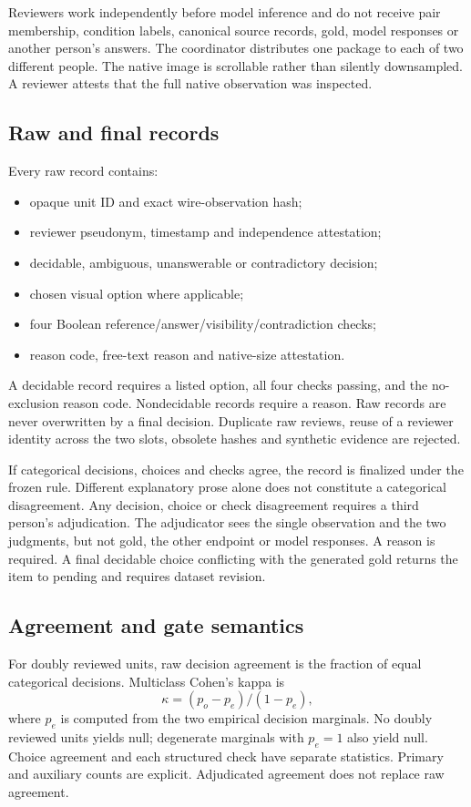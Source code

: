 \documentclass[10pt,twocolumn,letterpaper]{article}
\begin{document}
Reviewers work independently before model inference and do not receive
pair membership, condition labels, canonical source records, gold,
model responses or another person's answers. The coordinator distributes
one package to each of two different people. The native image is
scrollable rather than silently downsampled. A reviewer attests that
the full native observation was inspected.

\subsection{Raw and final records}
Every raw record contains:
\begin{itemize}\setlength\itemsep{1pt}
\item opaque unit ID and exact wire-observation hash;
\item reviewer pseudonym, timestamp and independence attestation;
\item decidable, ambiguous, unanswerable or contradictory decision;
\item chosen visual option where applicable;
\item four Boolean reference/answer/visibility/contradiction checks;
\item reason code, free-text reason and native-size attestation.
\end{itemize}
A decidable record requires a listed option, all four checks passing,
and the no-exclusion reason code. Nondecidable records require a
reason. Raw records are never overwritten by a final decision.
Duplicate raw reviews, reuse of a reviewer identity across the two
slots, obsolete hashes and synthetic evidence are rejected.

If categorical decisions, choices and checks agree, the record is
finalized under the frozen rule. Different explanatory prose alone
does not constitute a categorical disagreement. Any decision, choice
or check disagreement requires a third person's adjudication.
The adjudicator sees the single observation and the two judgments,
but not gold, the other endpoint or model responses. A reason is
required. A final decidable choice conflicting with the generated
gold returns the item to pending and requires dataset revision.

\subsection{Agreement and gate semantics}
For doubly reviewed units, raw decision agreement is the fraction
of equal categorical decisions. Multiclass Cohen's kappa is
\begin{equation}
\kappa=(p_o-p_e)/(1-p_e),
\end{equation}
where $p_e$ is computed from the two empirical decision marginals.
No doubly reviewed units yields null; degenerate marginals with
$p_e=1$ also yield null. Choice agreement and each structured check
have separate statistics. Primary and auxiliary counts are explicit.
Adjudicated agreement does not replace raw agreement.
\end{document}
